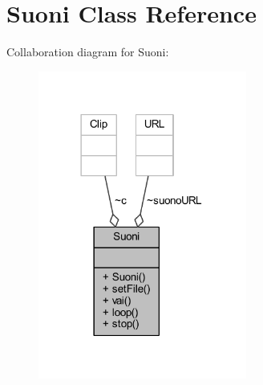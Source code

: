 \hypertarget{classa_1_1survival_1_1game_1_1_suoni}{}\section{Suoni Class Reference}
\label{classa_1_1survival_1_1game_1_1_suoni}


Collaboration diagram for Suoni\+:
\nopagebreak
\begin{figure}[H]
\begin{center}
\leavevmode
\includegraphics[width=194pt]{classa_1_1survival_1_1game_1_1_suoni__coll__graph}
\end{center}
\end{figure}

